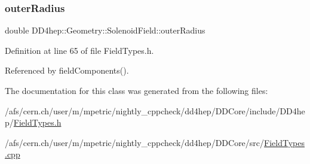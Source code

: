 \subsubsection{\texorpdfstring{outer\+Radius}{outerRadius}}
{\footnotesize\ttfamily double D\+D4hep\+::\+Geometry\+::\+Solenoid\+Field\+::outer\+Radius}



Definition at line 65 of file Field\+Types.\+h.



Referenced by field\+Components().



The documentation for this class was generated from the following files\+:\begin{DoxyCompactItemize}
\item 
/afs/cern.\+ch/user/m/mpetric/nightly\+\_\+cppcheck/dd4hep/\+D\+D\+Core/include/\+D\+D4hep/\hyperlink{_field_types_8h}{Field\+Types.\+h}\item 
/afs/cern.\+ch/user/m/mpetric/nightly\+\_\+cppcheck/dd4hep/\+D\+D\+Core/src/\hyperlink{_field_types_8cpp}{Field\+Types.\+cpp}\end{DoxyCompactItemize}
